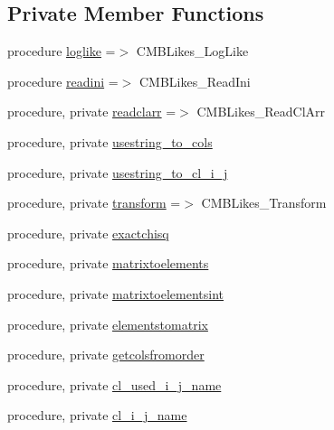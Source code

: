 \subsection*{Private Member Functions}
\begin{DoxyCompactItemize}
\item 
procedure \mbox{\hyperlink{structcmblikes_1_1tcmblikes_a583950da6d09dd2892204b4b6bb6cbe6}{loglike}} =$>$ C\+M\+B\+Likes\+\_\+\+Log\+Like
\item 
procedure \mbox{\hyperlink{structcmblikes_1_1tcmblikes_a51a87aafcf3bb5fcad7dec0889f693cf}{readini}} =$>$ C\+M\+B\+Likes\+\_\+\+Read\+Ini
\item 
procedure, private \mbox{\hyperlink{structcmblikes_1_1tcmblikes_a839b3f4612907b7422257f8b0ee4be93}{readclarr}} =$>$ C\+M\+B\+Likes\+\_\+\+Read\+Cl\+Arr
\item 
procedure, private \mbox{\hyperlink{structcmblikes_1_1tcmblikes_a083d3d6b0d3f6311bce70bda25c1dd0b}{usestring\+\_\+to\+\_\+cols}}
\item 
procedure, private \mbox{\hyperlink{structcmblikes_1_1tcmblikes_ab88a048b5460db5289294b282cd03c1b}{usestring\+\_\+to\+\_\+cl\+\_\+i\+\_\+j}}
\item 
procedure, private \mbox{\hyperlink{structcmblikes_1_1tcmblikes_a42d2998562f20cc6a3c59e10a8e49bf3}{transform}} =$>$ C\+M\+B\+Likes\+\_\+\+Transform
\item 
procedure, private \mbox{\hyperlink{structcmblikes_1_1tcmblikes_a2277862c745bf6ba83383d11fbccc514}{exactchisq}}
\item 
procedure, private \mbox{\hyperlink{structcmblikes_1_1tcmblikes_a9e99dd58dc667e263045c93a0deeab2f}{matrixtoelements}}
\item 
procedure, private \mbox{\hyperlink{structcmblikes_1_1tcmblikes_ae56fa10726161ffa85a342d47e04ca22}{matrixtoelementsint}}
\item 
procedure, private \mbox{\hyperlink{structcmblikes_1_1tcmblikes_a42e36299d0db001d07ed47f3a50966a6}{elementstomatrix}}
\item 
procedure, private \mbox{\hyperlink{structcmblikes_1_1tcmblikes_af0b3fa3f409ac17043818c9fafe7b2d9}{getcolsfromorder}}
\item 
procedure, private \mbox{\hyperlink{structcmblikes_1_1tcmblikes_a4103f8b07a0a5eb25f582af08084e28a}{cl\+\_\+used\+\_\+i\+\_\+j\+\_\+name}}
\item 
procedure, private \mbox{\hyperlink{structcmblikes_1_1tcmblikes_a5effad20c7617172da259ab994a91060}{cl\+\_\+i\+\_\+j\+\_\+name}}
\item 

\end{DoxyCompactItemize}
